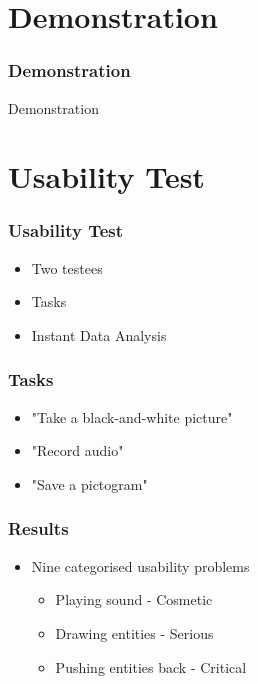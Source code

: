 	\section{Demonstration}
	
		\begin{frame}
			\frametitle{Demonstration}
			\begin{center}
				Demonstration
			\end{center}
		\end{frame}	
		
	\section{Usability Test}
		\begin{frame}
			\frametitle{Usability Test}
			\begin{itemize}
				\item Two testees
				\item Tasks
				\item Instant Data Analysis
			\end{itemize}
		\end{frame}
		
		\begin{frame}
			\frametitle{Tasks}
			\begin{itemize}
				\item "Take a black-and-white picture"
				\item "Record audio"
				\item "Save a pictogram"
			\end{itemize}
		\end{frame}
		
		\begin{frame}
			\frametitle{Results}
			\begin{itemize}
				\item Nine categorised usability problems
				\begin{itemize}
					\item Playing sound - Cosmetic
					\item Drawing entities - Serious
					\item Pushing entities back - Critical
				\end{itemize}
			\end{itemize}
		\end{frame}
		
		
		
		